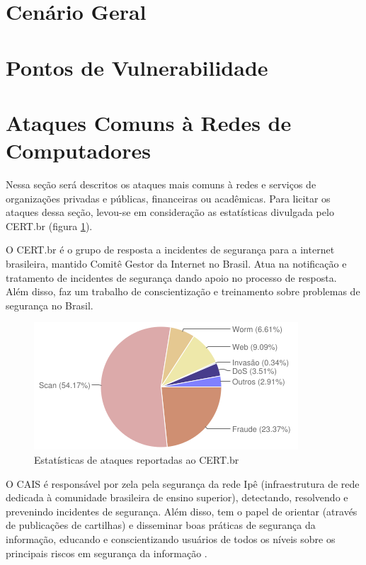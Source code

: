 \documentclass[
	12pt,				
	openright,		
	twoside,	
	a4paper,
	english,	
	brazil	
	]{abntex2}
\begin{document}
\section{Cenário Geral} \label{sec:geral}
\section{Pontos de Vulnerabilidade} \label{sec:vulnerabilidade}
\section{Ataques Comuns à Redes de Computadores} \label{sec:ataques}

Nessa seção será descritos os ataques mais comuns à redes e serviços de organizações privadas e públicas, financeiras ou acadêmicas. Para licitar os ataques dessa seção, levou-se em consideração as estatísticas divulgada pelo CERT.br (figura \ref{fig:cert}).

O CERT.br é o grupo de resposta a incidentes de segurança para a internet brasileira, mantido Comitê Gestor da Internet no Brasil. Atua na notificação e tratamento de incidentes de segurança dando apoio no processo de resposta. Além disso, faz um trabalho de conscientização e treinamento sobre problemas de segurança no Brasil. 

\begin{figure}[!htb]
 \centering
 \includegraphics[scale=.7]{incidentes-reportados.png}
 \caption{Estatísticas de ataques reportadas ao CERT.br}
 \label{fig:cert}
\end{figure}

O CAIS é responsável por zela pela segurança da rede Ipê (infraestrutura de rede dedicada à comunidade brasileira de ensino superior), detectando, resolvendo e prevenindo incidentes de segurança. Além disso, tem o papel de orientar (através de publicações de cartilhas) e disseminar boas práticas de segurança da informação, educando e conscientizando usuários de todos os níveis sobre os principais riscos em segurança da informação \cite{cais}.
\end{document}
